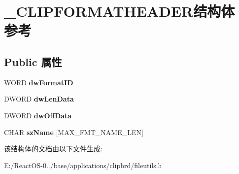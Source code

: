 \hypertarget{struct___c_l_i_p_f_o_r_m_a_t_h_e_a_d_e_r}{}\section{\+\_\+\+C\+L\+I\+P\+F\+O\+R\+M\+A\+T\+H\+E\+A\+D\+E\+R结构体 参考}
\label{struct___c_l_i_p_f_o_r_m_a_t_h_e_a_d_e_r}
\subsection*{Public 属性}
\begin{DoxyCompactItemize}
\item 
\mbox{\label{struct___c_l_i_p_f_o_r_m_a_t_h_e_a_d_e_r_a7a9aa3eca0f4c0ad2f98ccd75cecaa9d}} 
W\+O\+RD {\bfseries dw\+Format\+ID}
\item 
\mbox{\label{struct___c_l_i_p_f_o_r_m_a_t_h_e_a_d_e_r_a9cdbd9c3639dc6ec92f6ca4c07cb0122}} 
D\+W\+O\+RD {\bfseries dw\+Len\+Data}
\item 
\mbox{\label{struct___c_l_i_p_f_o_r_m_a_t_h_e_a_d_e_r_a5f6badb2c784a3789173789c00ea1f0b}} 
D\+W\+O\+RD {\bfseries dw\+Off\+Data}
\item 
\mbox{\label{struct___c_l_i_p_f_o_r_m_a_t_h_e_a_d_e_r_a793c819ebf4a8b668e24788c93280843}} 
C\+H\+AR {\bfseries sz\+Name} \mbox{[}M\+A\+X\+\_\+\+F\+M\+T\+\_\+\+N\+A\+M\+E\+\_\+\+L\+EN\mbox{]}
\end{DoxyCompactItemize}


该结构体的文档由以下文件生成\+:\begin{DoxyCompactItemize}
\item 
E\+:/\+React\+O\+S-\/0../base/applications/clipbrd/fileutils.\+h\end{DoxyCompactItemize}

